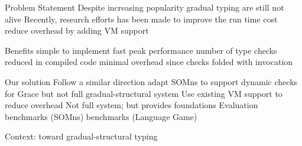 \begin{outline}

\1 Problem Statement
    \2 Despite increasing popularity gradual typing are still not alive
    \2 Recently, research efforts has been made to improve the run time cost
        \3 reduce overhead by adding VM support

\1 Benefits
    \2 simple to implement
    \2 fast peak performance
        \3 number of type checks reduced in compiled code
        \3 minimal overhead since checks folded with invocation

\1 Our solution
    \2 Follow a similar direction
        \3 adapt SOMns to support dynamic checks for Grace
        \3 but not full gradual-structural system
        \3 Use existing VM support to reduce overhead
        \3 Not full system; but provides foundations
    \2 Evaluation
        \3 benchmarks (SOMns)
        \3 benchmarks (Language Game)

\1 Context: toward gradual-structural typing

\end{outline}
